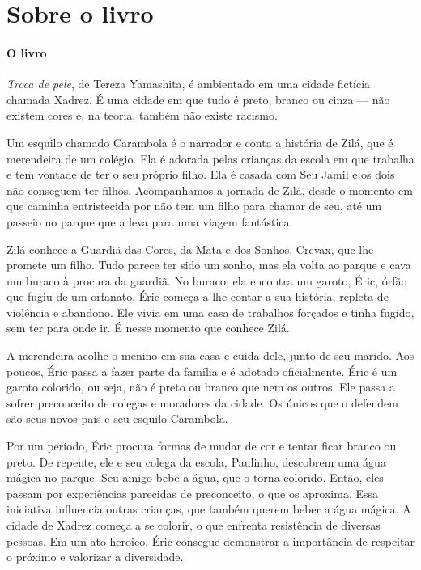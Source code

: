 \documentclass[11pt]{extarticle}
\begin{document}
\section{Sobre o livro} 

\paragraph{O livro} \textit{Troca de pele}, de Tereza Yamashita, é ambientado em uma cidade fictícia chamada Xadrez. É uma cidade em que tudo é preto, branco ou cinza --- não existem cores e, na teoria, também não existe racismo. 

Um esquilo chamado Carambola é o narrador e conta a história de Zilá, que é merendeira de um colégio. Ela é adorada pelas crianças da escola em que trabalha e tem vontade de ter o seu próprio filho. Ela é casada com Seu Jamil e os dois não conseguem ter filhos.
Acompanhamos a jornada de Zilá, desde o momento em que caminha entristecida por não tem um filho para chamar de seu, até um passeio no parque que a leva para uma viagem fantástica. 

Zilá conhece a Guardiã das Cores, da Mata e dos Sonhos, Crevax, que lhe promete um filho. Tudo parece ter sido um sonho, mas ela volta ao parque e cava um buraco à procura da guardiã. No buraco, ela encontra um garoto, Éric, órfão que fugiu de um orfanato. Éric começa a lhe contar a sua história, repleta de violência e abandono. Ele vivia em uma casa de trabalhos forçados e tinha fugido, sem ter para onde ir. É nesse momento que conhece Zilá.

A merendeira acolhe o menino em sua casa e cuida dele, junto de seu marido. Aos poucos, Éric passa a fazer parte da família e é adotado oficialmente. Éric é um garoto colorido, ou seja, não é preto ou branco que nem os outros. Ele passa a sofrer preconceito de colegas e moradores da cidade. Os únicos que o defendem são seus novos pais e seu esquilo Carambola.

Por um período, Éric procura formas de mudar de cor e tentar ficar branco ou preto. De repente, ele e seu colega da escola, Paulinho, descobrem uma água mágica no parque. Seu amigo bebe a água, que o torna colorido. Então, eles passam por experiências parecidas de preconceito, o que os aproxima. Essa iniciativa influencia outras crianças, que também querem beber a água mágica. A cidade de Xadrez começa a se colorir, o que enfrenta resistência de diversas pessoas. Em um ato heroico, Éric consegue demonstrar a importância de respeitar o próximo e valorizar a diversidade.
\end{document}
